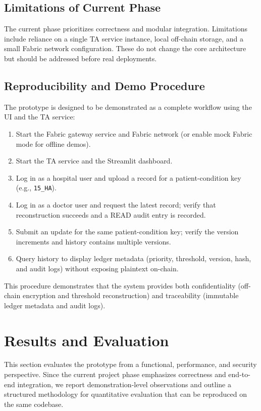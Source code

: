 \documentclass{IEEEtran}
\begin{document}
\subsection{Limitations of Current Phase}
The current phase prioritizes correctness and modular integration. Limitations include reliance on a single TA service instance, local off-chain storage, and a small Fabric network configuration. These do not change the core architecture but should be addressed before real deployments.

\subsection{Reproducibility and Demo Procedure}
The prototype is designed to be demonstrated as a complete workflow using the UI and the TA service:
\begin{enumerate}
\item Start the Fabric gateway service and Fabric network (or enable mock Fabric mode for offline demos).
\item Start the TA service and the Streamlit dashboard.
\item Log in as a hospital user and upload a record for a patient-condition key (e.g., \texttt{15\_HA}).
\item Log in as a doctor user and request the latest record; verify that reconstruction succeeds and a READ audit entry is recorded.
\item Submit an update for the same patient-condition key; verify the version increments and history contains multiple versions.
\item Query history to display ledger metadata (priority, threshold, version, hash, and audit logs) without exposing plaintext on-chain.
\end{enumerate}
This procedure demonstrates that the system provides both confidentiality (off-chain encryption and threshold reconstruction) and traceability (immutable ledger metadata and audit logs).

\section{Results and Evaluation}
This section evaluates the prototype from a functional, performance, and security perspective. Since the current project phase emphasizes correctness and end-to-end integration, we report demonstration-level observations and outline a structured methodology for quantitative evaluation that can be reproduced on the same codebase.
\end{document}
